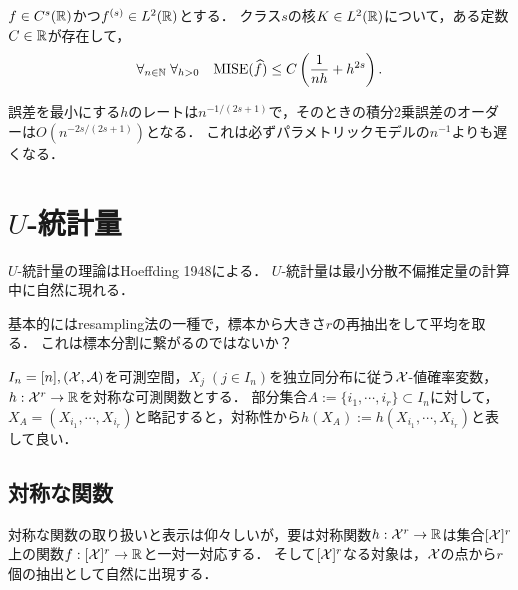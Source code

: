 \documentclass[uplatex,dvipdfmx]{jsreport}
\begin{document}
\begin{theorem}
    $f\in C^s(\mathbb{R})$かつ$f^{(s)}\in L^2(\mathbb{R})$とする．
    クラス$s$の核$K\in L^2(\mathbb{R})$について，ある定数$C\in\mathbb{R}$が存在して，
    \[\forall_{n\in\mathbb{N}}\;\forall_{h>0}\quad\mathrm{MISE}(\widehat{f})\le C\left(\frac{1}{nh}+h^{2s}\right).\]
\end{theorem}
\begin{remarks}
    誤差を最小にする$h$のレートは$n^{-1/(2s+1)}$で，そのときの積分2乗誤差のオーダーは$O(n^{-2s/(2s+1)})$となる．
    これは必ずパラメトリックモデルの$n^{-1}$よりも遅くなる．
\end{remarks}

\section{$U$-統計量}

\begin{tcolorbox}[colframe=ForestGreen, colback=ForestGreen!10!white,breakable,colbacktitle=ForestGreen!40!white,coltitle=black,fonttitle=\bfseries\sffamily,
title=]
    $U$-統計量の理論はHoeffding 1948による．
    $U$-統計量は最小分散不偏推定量の計算中に自然に現れる．

    基本的にはresampling法の一種で，標本から大きさ$r$の再抽出をして平均を取る．
    これは標本分割に繋がるのではないか？
\end{tcolorbox}

\begin{notation}
    $I_n=[n],(\mathcal{X},\mathcal{A})$を可測空間，$X_j\;(j\in I_n)$を独立同分布に従う$\mathcal{X}$-値確率変数，$h:\mathcal{X}^r\to\mathbb{R}$を対称な可測関数とする．
    部分集合$A:=\{i_1,\cdots,i_r\}\subset I_n$に対して，$X_A=(X_{i_1},\cdots,X_{i_r})$と略記すると，対称性から$h(X_A):=h(X_{i_1},\cdots,X_{i_r})$と表して良い．
\end{notation}

\subsection{対称な関数}

\begin{tcolorbox}[colframe=ForestGreen, colback=ForestGreen!10!white,breakable,colbacktitle=ForestGreen!40!white,coltitle=black,fonttitle=\bfseries\sffamily,
title=]
    対称な関数の取り扱いと表示は仰々しいが，要は対称関数$h:\mathcal{X}^r\to\mathbb{R}$は集合$[\mathcal{X}]^r$上の関数$f:[\mathcal{X}]^r\to\mathbb{R}$と一対一対応する．
    そして$[\mathcal{X}]^r$なる対象は，$\mathcal{X}$の点から$r$個の抽出として自然に出現する．
\end{tcolorbox}
\end{document}
